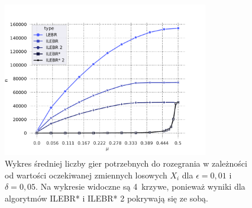 \documentclass[inzynierska]{pwr_wmat_praca_dyplomowa}
\theoremstyle{plain}
\numberwithin{theorem}{chapter}
\theoremstyle{definition}
\numberwithin{theorem}{chapter}
\begin{document}
	\begin{figure}
		\centering
		\includegraphics[width=0.8\textwidth]{imagens/needed_games_to_play.pdf}
		\caption{Wykres średniej liczby gier potrzebnych do rozegrania w zależności od wartości oczekiwanej zmiennych losowych $X_i$ dla $\epsilon=0,01$ i $\delta = 0,05$. Na wykresie widoczne są 4~krzywe, ponieważ wyniki dla algorytmów ILEBR* i ILEBR* 2 pokrywają się ze sobą.}
		\label{fig:needed_games_to_play}
	\end{figure}
\end{document}
